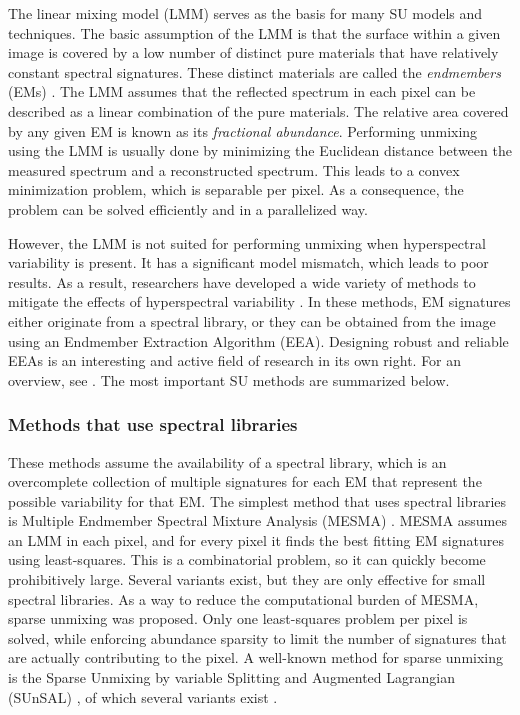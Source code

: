 The linear mixing model (LMM) serves as the basis for many SU models and techniques. The basic assumption of the LMM is that the surface within a given image is covered by a low number of distinct pure materials that have relatively constant spectral signatures. These distinct materials are called the \textit{endmembers} (EMs) \cite{keshava_spectral_2002}. The LMM assumes that the reflected spectrum in each pixel can be described as a linear combination of the pure materials.  The relative area covered by any given EM is known as its \textit{fractional abundance}. 
Performing unmixing using the LMM is usually done by minimizing the Euclidean distance between the measured spectrum and a reconstructed spectrum. This leads to a convex minimization problem, which is separable per pixel. As a consequence, the problem can be solved efficiently and in a parallelized way.

However, the LMM is not suited for performing unmixing when hyperspectral variability is present. It has a significant model mismatch, which leads to poor results. As a result, researchers have developed a wide variety of methods to mitigate the effects of hyperspectral variability \cite{borsoi_spectral_2021}. In these methods, EM signatures either originate from a spectral library, or they can be obtained from the image using an Endmember Extraction Algorithm (EEA). Designing robust and reliable EEAs is an interesting and active field of research in its own right. For an overview, see \cite{kale_hyperspectral_2019}. The most important SU methods are summarized below.

\subsubsection{Methods that use spectral libraries}
These methods assume the availability of a spectral library, which is an overcomplete collection of multiple signatures for each EM that represent the possible variability for that EM.
The simplest method that uses spectral libraries is Multiple Endmember Spectral Mixture Analysis (MESMA) \cite{roberts_mapping_1998}. MESMA assumes an LMM in each pixel, and for every pixel it finds the best fitting EM signatures using least-squares. This is a combinatorial problem, so it can quickly become prohibitively large. Several variants exist, but they are only effective for small spectral libraries. As a way to reduce the computational burden of MESMA, sparse unmixing was proposed. Only one least-squares problem per pixel is solved, while enforcing abundance sparsity to limit the number of signatures that are actually contributing to the pixel. A well-known method for sparse unmixing is the Sparse Unmixing by variable Splitting and Augmented Lagrangian (SUnSAL) \cite{bioucas-dias_alternating_2010}, of which several variants exist \cite{iordache_total_2012}.



